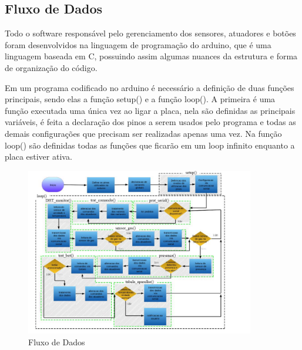 \subsection{Fluxo de Dados}

\par Todo o software responsável pelo gerenciamento dos sensores, atuadores e botões foram desenvolvidos na linguagem de programação do arduino, que é uma linguagem baseada em C, possuindo assim algumas nuances da estrutura e forma de organização do código.
\par Em um programa codificado no arduino é necessário a definição de duas funções principais, sendo elas a função setup() e a função loop(). A primeira é uma função executada uma única vez ao ligar a placa, nela são definidas as principais variáveis, é feita a declaração dos pinos a serem usados pelo programa e todas as demais configurações que precisam ser realizadas apenas uma vez. Na função loop() são definidas todas as funções que ficarão em um loop infinito enquanto a placa estiver ativa.

\begin{figure}[!h]
\caption{Fluxo de Dados}
\centering
\includegraphics[width=10cm]{figuras/fluxo_dados}
\end{figure}

